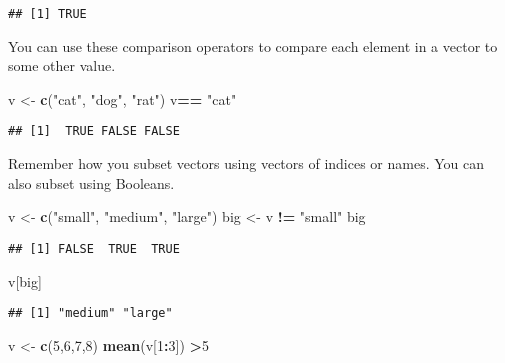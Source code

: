 \documentclass[
]{article}
\newenvironment{Shaded}{\begin{snugshade}}{\end{snugshade}}
\newcommand{\DecValTok}[1]{\textcolor[rgb]{0.00,0.00,0.81}{#1}}
\newcommand{\KeywordTok}[1]{\textcolor[rgb]{0.13,0.29,0.53}{\textbf{#1}}}
\newcommand{\NormalTok}[1]{#1}
\newcommand{\OperatorTok}[1]{\textcolor[rgb]{0.81,0.36,0.00}{\textbf{#1}}}
\newcommand{\StringTok}[1]{\textcolor[rgb]{0.31,0.60,0.02}{#1}}
\begin{document}
\begin{verbatim}
## [1] TRUE
\end{verbatim}

You can use these comparison operators to compare each element in a
vector to some other value.

\begin{Shaded}
\begin{Highlighting}[]
\NormalTok{v <-}\StringTok{ }\KeywordTok{c}\NormalTok{(}\StringTok{"cat"}\NormalTok{, }\StringTok{"dog"}\NormalTok{, }\StringTok{"rat"}\NormalTok{)}
\NormalTok{v}\OperatorTok{==}\StringTok{ "cat"}
\end{Highlighting}
\end{Shaded}

\begin{verbatim}
## [1]  TRUE FALSE FALSE
\end{verbatim}

Remember how you subset vectors using vectors of indices or names. You
can also subset using Booleans.

\begin{Shaded}
\begin{Highlighting}[]
\NormalTok{v <-}\StringTok{ }\KeywordTok{c}\NormalTok{(}\StringTok{"small"}\NormalTok{, }\StringTok{"medium"}\NormalTok{, }\StringTok{"large"}\NormalTok{)}
\NormalTok{big <-}\StringTok{ }\NormalTok{v }\OperatorTok{!=}\StringTok{ "small"}
\NormalTok{big}
\end{Highlighting}
\end{Shaded}

\begin{verbatim}
## [1] FALSE  TRUE  TRUE
\end{verbatim}

\begin{Shaded}
\begin{Highlighting}[]
\NormalTok{v[big]}
\end{Highlighting}
\end{Shaded}

\begin{verbatim}
## [1] "medium" "large"
\end{verbatim}

\begin{Shaded}
\begin{Highlighting}[]
\NormalTok{v <-}\StringTok{ }\KeywordTok{c}\NormalTok{(}\DecValTok{5}\NormalTok{,}\DecValTok{6}\NormalTok{,}\DecValTok{7}\NormalTok{,}\DecValTok{8}\NormalTok{)}
\KeywordTok{mean}\NormalTok{(v[}\DecValTok{1}\OperatorTok{:}\DecValTok{3}\NormalTok{]) }\OperatorTok{>}\DecValTok{5}
\end{Highlighting}
\end{Shaded}
\end{document}
